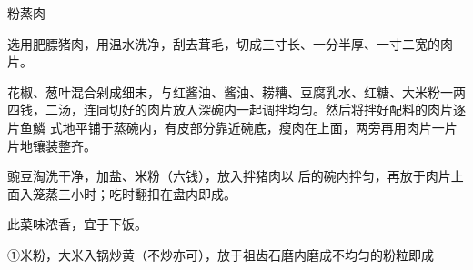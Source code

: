 \begin{recipe}{粉蒸肉}

\ingredients


\cooking

\step 选用肥膘猪肉，用温水洗净，刮去茸毛，切成三寸长、一分半厚、一寸二宽的肉片。

\step 花椒、葱叶混合剁成细末，与红酱油、酱油、耢糟、豆腐乳水、红糖、大米粉一两
四钱，二汤，连同切好的肉片放入深碗内一起调拌均匀。然后将拌好配料的肉片逐片鱼鱗
式地平铺于蒸碗内，有皮部分靠近碗底，瘦肉在上面，两旁再用肉片一片片地镶装整齐。

\step 豌豆淘洗干净，加盐、米粉（六钱），放入拌猪肉以 后的碗内拌匀，再放于肉片上
面入笼蒸三小时；吃时翻扣在盘内即成。

\notes

此菜味浓香，宜于下饭。

①米粉，大米入锅炒黄（不炒亦可），放于祖齿石磨内磨成不均匀的粉粒即成

\end{recipe}

